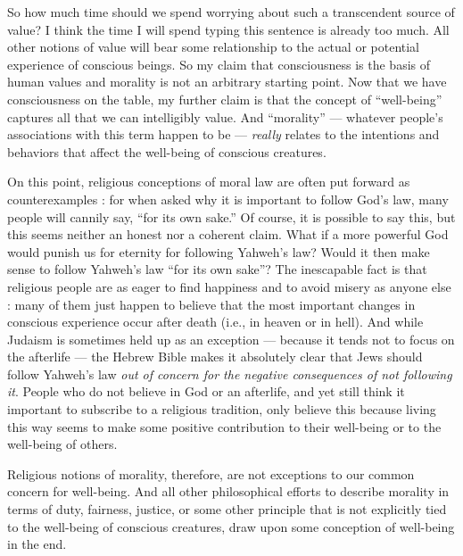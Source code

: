 \documentclass[a4paper,14pt]{extarticle}
\begin{document}
So how much time should we spend worrying about such a transcendent source of value?
I think the time I will spend typing this sentence is already too much.
All other notions of value will bear some relationship to the actual or potential experience of conscious beings.
So my claim that consciousness is the basis of human values and morality is not an arbitrary starting point.
Now that we have consciousness on the table, my further claim is that the concept of ``well-being'' captures all that we can intelligibly value.
And ``morality'' --- whatever people's associations with this term happen to be --- \textit{really} relates to the intentions and behaviors that affect the well-being of conscious creatures.

On this point, religious conceptions of moral law are often put forward as counterexamples :
for when asked why it is important to follow God's law, many people will cannily say, ``for its own sake.''
Of course, it is possible to say this, but this seems neither an honest nor a coherent claim.
What if a more powerful God would punish us for eternity for following Yahweh's law?
Would it then make sense to follow Yahweh's law ``for its own sake''?
The inescapable fact is that religious people are as eager to find happiness and to avoid misery as anyone else :
many of them just happen to believe that the most important changes in conscious experience occur after death (i.e., in heaven or in hell).
And while Judaism is sometimes held up as an exception --- because it tends not to focus on the afterlife --- the Hebrew Bible makes it absolutely clear that Jews should follow Yahweh's law \textit{out of concern for the negative consequences of not following it}.
People who do not believe in God or an afterlife, and yet still think it important to subscribe to a religious tradition, only believe this because living this way seems to make some positive contribution to their well-being or to the well-being of others.

Religious notions of morality, therefore, are not exceptions to our common concern for well-being.
And all other philosophical efforts to describe morality in terms of duty, fairness, justice, or some other principle that is not explicitly tied to the well-being of conscious creatures, draw upon some conception of well-being in the end.
\end{document}
